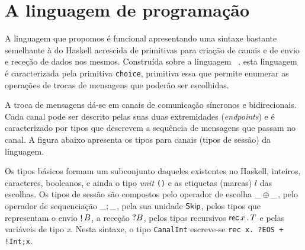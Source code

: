 \section{A linguagem de programação}


A linguagem que propomos é funcional apresentando uma sintaxe bastante
semelhante à do Haskell acrescida de primitivas para criação de canais
e de envio e receção de dados nos mesmos.  Construída sobre a
linguagem \freest~\cite{2019freest}, esta linguagem é caracterizada
pela primitiva \lstinline|choice|, primitiva essa que permite enumerar
as operações de trocas de mensagens que poderão ser escolhidas.

A troca de mensagens dá-se em canais de comunicação síncronos e
bidirecionais. Cada canal pode ser descrito pelas suas duas
extremidades (\textit{endpoints}) e é caracterizado por tipos que
descrevem a sequência de mensagens que passam no canal. %
A figura abaixo apresenta os tipos para canais (tipos de sessão) da
linguagem.
%


Os tipos básicos formam um subconjunto daqueles existentes no Haskell,
inteiros, caracteres, booleanos, e ainda o tipo \textit{unit}
\lstinline|()| e as etiquetas (marcas) $l$ das escolhas.  Os tipos de
sessão são compostos pelo operador de escolha $\_ \oplus \_$, pelo
operador de sequenciação $\_;\_$, pela sua unidade $\mathsf{Skip}$,
pelos tipos que representam o envio $\mathop! B$, a receção $?B$,
pelos tipos recursivos $\mathsf{rec}\,x\,.\,T$ e pelas variáveis de tipo
\textit{x}. Nesta sintaxe, o tipo \lstinline|CanalInt| escreve-se
%
\lstinline|rec x. ?EOS + !Int;x|.

